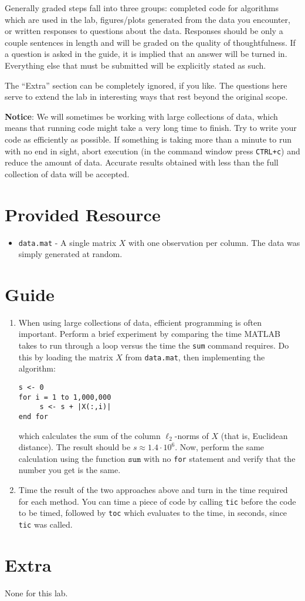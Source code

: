 \documentclass[11pt,noanswers,addpoints]{exam}
\begin{document}
Generally graded steps fall into three groups: completed code for algorithms which are 
used in the lab, figures/plots generated from the data you encounter, or written responses to questions
about the data. Responses should be only a couple sentences in length and will be graded on the quality
of thoughtfulness. If a question is asked in the guide, it is implied that an answer will be turned in.
Everything else that must be submitted will be explicitly stated as such. 

The ``Extra'' section can be completely ignored, if you like. The questions here serve to extend the lab
in interesting ways that rest beyond the original scope.

\textbf{Notice}: We will sometimes be working with large collections of data, which means that running code
might take a very long time to finish. Try to write your code as efficiently as possible. If something is taking more
than a minute to run with no end in sight, abort execution (in the command window press \texttt{CTRL+c}) and reduce 
the amount of data. Accurate results obtained with less than the full collection of data will be accepted.


\section{Provided Resource}

\begin{itemize}
\item \texttt{data.mat} - A single matrix $X$ with one observation per column. The data was simply
generated at random.
\end{itemize}

\section{Guide}

\begin{enumerate}
\item When using large collections of data, efficient programming is often important.
Perform a brief experiment by comparing the time MATLAB takes
to run through a loop versus the time the \texttt{sum} command requires. Do this by
loading the matrix $X$ from \texttt{data.mat}, then implementing the algorithm:
\begin{verbatim}
s <- 0
for i = 1 to 1,000,000
     s <- s + |X(:,i)|
end for
\end{verbatim}
which calculates the sum of the column $\ell_2$-norms of $X$ (that is, Euclidean distance). The result should be
$s \approx 1.4\cdot 10^{6}$. Now, perform the same calculation using the
function $\texttt{sum}$ with no \texttt{for} statement and verify that the number
you get is the same.
\item Time the result of the two approaches above and turn in
the time required for each method. You can time a piece of code by calling \texttt{tic}
before the code to be timed, followed by \texttt{toc} which evaluates to the time, in seconds, since
\texttt{tic} was called.
\end{enumerate}

\section{Extra}

None for this lab.
\end{document}
